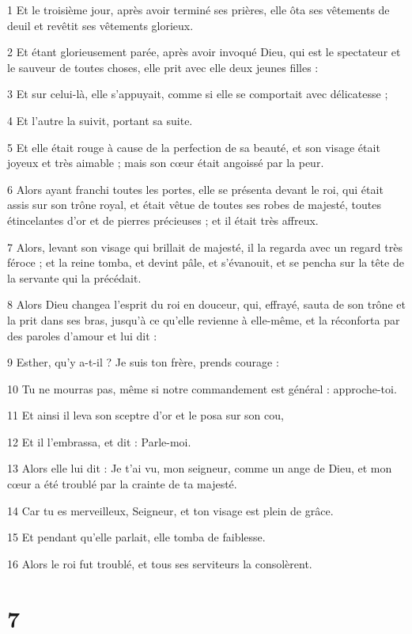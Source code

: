 \par 1 Et le troisième jour, après avoir terminé ses prières, elle ôta ses vêtements de deuil et revêtit ses vêtements glorieux.
\par 2 Et étant glorieusement parée, après avoir invoqué Dieu, qui est le spectateur et le sauveur de toutes choses, elle prit avec elle deux jeunes filles :
\par 3 Et sur celui-là, elle s'appuyait, comme si elle se comportait avec délicatesse ;
\par 4 Et l'autre la suivit, portant sa suite.
\par 5 Et elle était rouge à cause de la perfection de sa beauté, et son visage était joyeux et très aimable ; mais son cœur était angoissé par la peur.
\par 6 Alors ayant franchi toutes les portes, elle se présenta devant le roi, qui était assis sur son trône royal, et était vêtue de toutes ses robes de majesté, toutes étincelantes d'or et de pierres précieuses ; et il était très affreux.
\par 7 Alors, levant son visage qui brillait de majesté, il la regarda avec un regard très féroce ; et la reine tomba, et devint pâle, et s'évanouit, et se pencha sur la tête de la servante qui la précédait.
\par 8 Alors Dieu changea l'esprit du roi en douceur, qui, effrayé, sauta de son trône et la prit dans ses bras, jusqu'à ce qu'elle revienne à elle-même, et la réconforta par des paroles d'amour et lui dit :
\par 9 Esther, qu'y a-t-il ? Je suis ton frère, prends courage :
\par 10 Tu ne mourras pas, même si notre commandement est général : approche-toi.
\par 11 Et ainsi il leva son sceptre d'or et le posa sur son cou,
\par 12 Et il l'embrassa, et dit : Parle-moi.
\par 13 Alors elle lui dit : Je t'ai vu, mon seigneur, comme un ange de Dieu, et mon cœur a été troublé par la crainte de ta majesté.
\par 14 Car tu es merveilleux, Seigneur, et ton visage est plein de grâce.
\par 15 Et pendant qu'elle parlait, elle tomba de faiblesse.
\par 16 Alors le roi fut troublé, et tous ses serviteurs la consolèrent.

\chapter{7}

